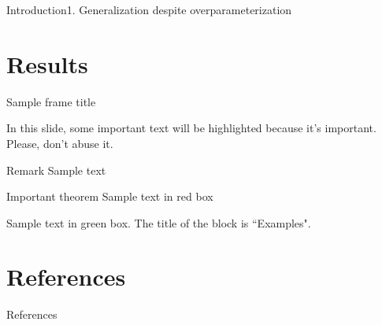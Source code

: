 \documentclass{beamer}
\begin{document}
\begin{frame}{Introduction}{1. Generalization despite overparameterization}
\end{frame}



\section{Results}

\begin{frame}{Sample frame title}

In this slide, some important text will be
\alert{highlighted} because it's important.
Please, don't abuse it.

\begin{block}{Remark}
Sample text
\end{block}

\begin{alertblock}{Important theorem}
Sample text in red box
\end{alertblock}

\begin{examples}
Sample text in green box. The title of the block is ``Examples".
\end{examples}
\end{frame}


\section*{References}
\begin{frame}{References}
    
        
\end{frame}
\end{document}
